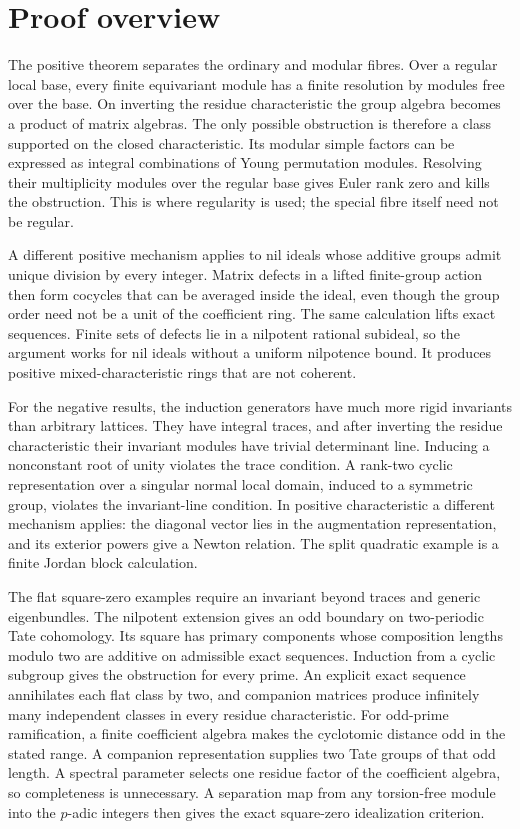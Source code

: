 \documentclass[11pt,a4paper]{article}
\theoremstyle{definition}\newtheorem{definition}[theorem]{Definition}
\theoremstyle{remark}\newtheorem{remark}[theorem]{Remark}
\begin{document}
\section{Proof overview}

The positive theorem separates the ordinary and modular fibres.
Over a regular local base, every finite equivariant module has a
finite resolution by modules free over the base.  On inverting the
residue characteristic the group algebra becomes a product of
matrix algebras.  The only possible obstruction is therefore a
class supported on the closed characteristic.  Its modular simple
factors can be expressed as integral combinations of Young
permutation modules.  Resolving their multiplicity modules over the
regular base gives Euler rank zero and kills the obstruction.
This is where regularity is used; the special fibre itself need
not be regular.

A different positive mechanism applies to nil ideals whose additive
groups admit unique division by every integer.  Matrix defects in a
lifted finite-group action then form cocycles that can be averaged
inside the ideal, even though the group order need not be a unit of
the coefficient ring.  The same calculation lifts exact sequences.
Finite sets of defects lie in a nilpotent rational subideal, so the
argument works for nil ideals without a uniform nilpotence bound.
It produces positive mixed-characteristic rings that are not coherent.

For the negative results, the induction generators have much more
rigid invariants than arbitrary lattices.  They have integral traces,
and after inverting the residue characteristic their invariant
modules have trivial determinant line.  Inducing a nonconstant
root of unity violates the trace condition.  A rank-two cyclic
representation over a singular normal local domain, induced to a
symmetric group, violates the invariant-line condition.  In positive characteristic a
different mechanism applies: the diagonal vector lies in the
augmentation representation, and its exterior powers give a
Newton relation.  The split quadratic example is a finite Jordan
block calculation.

The flat square-zero examples require an invariant beyond traces and
generic eigenbundles.  The nilpotent extension gives an odd boundary
on two-periodic Tate cohomology.  Its square has primary components
whose composition lengths modulo two are additive on admissible
exact sequences.  Induction from a cyclic subgroup gives the obstruction
for every prime.  An explicit exact sequence annihilates each flat
class by two, and companion matrices produce infinitely many
independent classes in every residue characteristic.  For odd-prime
ramification, a finite coefficient algebra makes the cyclotomic
distance odd in the stated range.  A companion representation supplies
two Tate groups of that odd length.  A spectral parameter selects one
residue factor of the coefficient algebra, so completeness is unnecessary.  A separation map
from any torsion-free module into the $p$-adic integers then gives the
exact square-zero idealization criterion.
\end{document}

